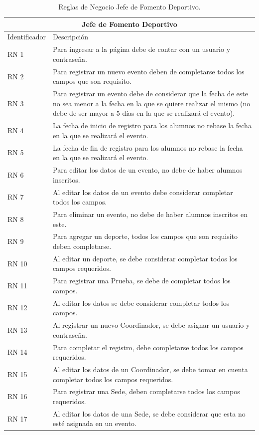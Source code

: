 \begin{table}[hbt!]
	\begin{center}
		\begin{tabular}{|p{30mm}|p{100mm}|}
			\hline
			\multicolumn{2}{|c|}{Jefe de Fomento Deportivo} \\
			\hline
			Identificador & Descripción \\
			\hline 
			RN 1 & Para ingresar a la página debe de contar con un usuario y contraseña. \\ \hline
			RN 2 &  Para registrar un nuevo evento deben de completarse todos los campos que son requisito.\\ \hline
			RN 3 & Para registrar un evento debe de considerar que la fecha de este no sea menor a la fecha en la que se quiere realizar el mismo (no debe de ser mayor  a 5 días en la que se realizará el evento). \\ \hline
			RN 4 &  La fecha de inicio de registro para los alumnos no rebase la fecha en la que se realizará el evento.\\ \hline
			RN 5 &  La fecha de fin de registro para los alumnos no rebase la fecha en la que se realizará el evento. \\ \hline
			RN 6 & Para editar los datos de un evento, no debe de haber alumnos inscritos. \\ \hline
			RN 7 &  Al editar los datos de un evento debe considerar completar todos los campos.\\ \hline
			RN 8 &  Para eliminar un evento, no debe de haber alumnos inscritos en este.\\ \hline
			RN 9 &  Para agregar un deporte, todos los campos que son requisito deben completarse.\\ \hline
			RN 10 &  Al editar un deporte, se debe considerar completar todos los campos requeridos.\\ \hline
			RN 11 &  Para registrar una Prueba, se debe de completar todos los campos.\\ \hline
			RN 12 & Al editar los datos se debe considerar completar todos los campos.\\ \hline
			RN 13 &  Al registrar un nuevo Coordinador, se debe asignar un usuario y contraseña.\\ \hline
			RN 14 &  Para completar el registro, debe completarse todos los campos requeridos.\\ \hline
			RN 15 &  Al editar los datos de un Coordinador, se debe tomar en cuenta completar todos los campos requeridos.\\ \hline
			RN 16 &  Para registrar una Sede, deben completarse todos los campos requeridos.\\ \hline
			RN 17 &  Al editar los datos de una Sede, se debe considerar que esta no esté asignada en un evento.\\ \hline
		\end{tabular}
		\caption{Reglas de Negocio Jefe de Fomento Deportivo.}
		\label{RNJFD}
	\end{center}
\end{table}

